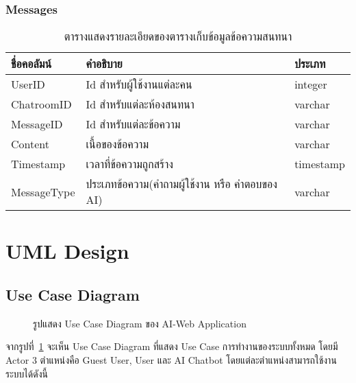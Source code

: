 \documentclass[12pt,oneside,openright,a4paper]{cpe-thai-project}
\begin{document}
\subsubsection{Messages}
\begin{table}[!h]
\caption{ตารางแสดงรายละเอียดของตารางเก็บข้อมูลข้อความสนทนา}\label{tbl:table3.5}
\begin{tabular}{|l|l|l|}
\hline
\textbf{ชื่อคอลัมน์} & \textbf{คำอธิบาย}                                                      & \textbf{ประเภท} \\ \hline
UserID               & Id สำหรับผู้ใช้งานแต่ละคน                                              & integer         \\ \hline
ChatroomID           & Id สำหรับแต่ละห้องสนทนา                                                & varchar         \\ \hline
MessageID            & Id สำหรับแต่ละข้อความ                          & varchar         \\ \hline
Content              & เนื้อของข้อความ                                & varchar         \\ \hline
Timestamp            & เวลาที่ข้อความถูกสร้าง                         & timestamp       \\ \hline
MessageType          & ประเภทข้อความ(คำถามผู้ใช้งาน หรือ คำตอบของ AI) & varchar         \\ \hline
\end{tabular}
\end{table}

\section{UML Design}
\subsection{Use Case Diagram}

\begin{figure}[!h]\centering
\setlength{\fboxrule}{0mm}
\caption{รูปแสดง Use Case Diagram ของ AI-Web Application}\label{fig:F3.21}
\end{figure}
จากรูปที่~\ref{fig:F3.21} จะเห็น Use Case Diagram ที่แสดง Use Case การทำงานของระบบทั้งหมด โดยมี Actor 3 ตำแหน่งคือ Guest User, User และ AI Chatbot โดยแต่ละตำแหน่งสามารถใช้งานระบบได้ดังนี้ \\
\end{document}
